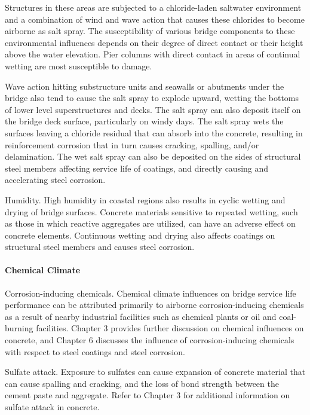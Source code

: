 Structures in these areas are subjected to a chloride-laden saltwater environment and a combination of wind and
wave action that causes these chlorides to become airborne as salt spray. The susceptibility of various bridge
components to these environmental influences depends on their degree of direct contact or their height above the
water elevation. Pier columns with direct contact in areas of continual wetting are most susceptible to damage.

Wave action hitting substructure units and seawalls or abutments under the bridge also tend to cause the salt
spray to explode upward, wetting the bottoms of lower level superstructures and decks. The salt spray can also
deposit itself on the bridge deck surface, particularly on windy days. The salt spray wets the surfaces leaving a
chloride residual that can absorb into the concrete, resulting in reinforcement corrosion that in turn causes cracking, spalling, and/or delamination. The wet salt spray can also be deposited on the sides of structural steel members
affecting service life of coatings, and directly causing and accelerating steel corrosion.

Humidity. High humidity in coastal regions also results in cyclic wetting and drying of bridge surfaces. Concrete
materials sensitive to repeated wetting, such as those in which reactive aggregates are utilized, can have an adverse
effect on concrete elements. Continuous wetting and drying also affects coatings on structural steel members and
causes steel corrosion.

\paragraph{Chemical Climate}

Corrosion-inducing chemicals. Chemical climate influences on bridge service life performance can be
attributed primarily to airborne corrosion-inducing chemicals as a result of nearby industrial facilities such as
chemical plants or oil and coal-burning facilities. Chapter 3 provides further discussion on chemical influences on
concrete, and Chapter 6 discusses the influence of corrosion-inducing chemicals with respect to steel coatings and
steel corrosion.

Sulfate attack. Exposure to sulfates can cause expansion of concrete material that can cause spalling and
cracking, and the loss of bond strength between the cement paste and aggregate. Refer to Chapter 3 for additional
information on sulfate attack in concrete.


